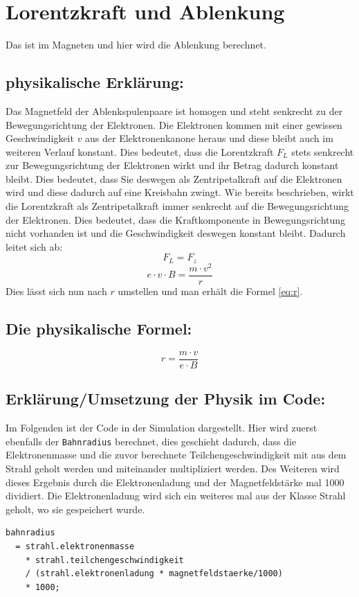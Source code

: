 \section{Lorentzkraft und Ablenkung}

Das ist im Magneten und hier wird die Ablenkung berechnet.


\subsection{physikalische Erklärung:}
Das Magnetfeld der Ablenkspulenpaare ist homogen und steht senkrecht zu der Bewegungsrichtung der Elektronen. Die Elektronen kommen mit einer gewissen Geschwindigkeit $v$ aus der Elektronenkanone heraus und diese bleibt auch im weiteren Verlauf konstant. Dies bedeutet, dass die Lorentzkraft $F_L$ stets senkrecht zur Bewegungsrichtung der Elektronen wirkt und ihr Betrag dadurch konstant bleibt. Dies bedeutet, dass Sie deswegen als Zentripetalkraft auf die Elektronen wird und diese dadurch auf eine Kreisbahn zwingt. Wie bereits beschrieben, wirkt die Lorentzkraft als Zentripetalkraft immer senkrecht auf die Bewegungsrichtung der Elektronen. Dies bedeutet, dass die Kraftkomponente in Bewegungsrichtung nicht vorhanden ist und die Geschwindigkeit deswegen konstant bleibt. Dadurch leitet sich ab: 
$$ F_L=F_z$$
$$ e \cdot v \cdot B = \frac{m \cdot v^2}{r}$$
Dies lässt sich nun nach $r$ umstellen und man erhält die Formel \ref{eq:r}.   

\subsection{Die physikalische Formel:}

\begin{equation}
     \label{eq:r}
     r = \frac{m \cdot v}{e \cdot B}
\end{equation}


\subsection{Erklärung/Umsetzung der Physik im Code:}

Im Folgenden ist der Code in der Simulation dargestellt. Hier wird zuerst ebenfalls der \lstinline$Bahnradius$ berechnet, dies geschieht dadurch, dass die Elektronenmasse und die zuvor berechnete Teilchengeschwindigkeit mit aus dem Strahl geholt werden und miteinander multipliziert werden. Des Weiteren wird dieses Ergebnis durch die Elektronenladung und der Magnetfeldstärke mal 1000 dividiert. Die Elektronenladung wird sich ein weiteres mal aus der Klasse Strahl geholt, wo sie gespeichert wurde.
\begin{lstlisting}
bahnradius
  = strahl.elektronenmasse
    * strahl.teilchengeschwindigkeit
    / (strahl.elektronenladung * magnetfeldstaerke/1000)
    * 1000;
\end{lstlisting}

